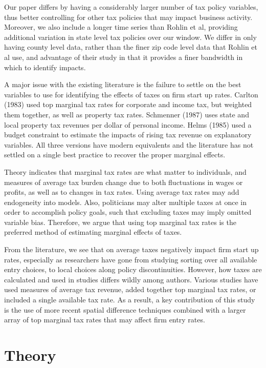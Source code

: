 \documentclass[12pt,a4paper]{article}
\begin{document}
Our paper differs by having a considerably larger number of tax policy variables, thus better controlling for other tax policies that may impact business activity. Moreover, we also include a longer time series than Rohlin et al, providing additional variation in state level tax policies over our window. We differ in only having county level data, rather than the finer zip code level data that Rohlin et al use, and advantage of their study in that it provides a finer bandwidth in which to identify impacts.

A major issue with the existing literature is the failure to settle on the best variables to use for identifying the effects of taxes on firm start up rates. Carlton (1983) used top marginal tax rates for corporate and income tax, but weighted them together, as well as property tax rates. Schmenner (1987) uses state and local property tax revenues per dollar of personal income. Helms (1985) used a budget constraint to estimate the impacts of rising tax revenue on explanatory variables. All three versions have modern equivalents and the literature has not settled on a single best practice to recover the proper marginal effects.

Theory indicates that marginal tax rates are what matter to individuals, and measures of average tax burden change due to both fluctuations in wages or profits, as well as to changes in tax rates. Using average tax rates may add endogeneity into models. Also, politicians may alter multiple taxes at once in order to accomplish policy goals, such that excluding taxes may imply omitted variable bias. Therefore, we argue that using top marginal tax rates is the preferred method of estimating marginal effects of taxes. 

From the literature, we see that on average taxes negatively impact firm start up rates, especially as researchers have gone from studying sorting over all available entry choices, to local choices along policy discontinuities. However, how taxes are calculated and used in studies differs wildly among authors. Various studies have used measures of average tax revenue, added together top marginal tax rates, or included a single available tax rate. As a result, a key contribution of this study is the use of more recent spatial difference techniques combined with a larger array of top marginal tax rates that may affect firm entry rates.

\section{Theory}
\end{document}
